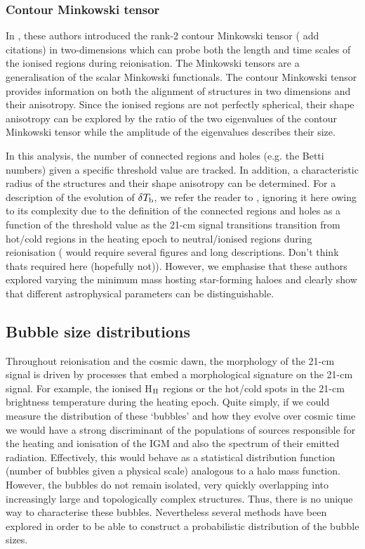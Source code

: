 \subsubsection{Contour Minkowski tensor}

In \cite{Kapahtia:2018,Kapahtia:2019}, these authors introduced the rank-2 contour Minkowski tensor ({\color{red} add citations}) in two-dimensions which can probe both the length and time scales of the ionised regions during reionisation. The Minkowski tensors are a generalisation of the scalar Minkowski functionals. The contour Minkowski tensor provides information on both the alignment of structures in two dimensions and their anisotropy. Since the ionised regions are not perfectly spherical, their shape anisotropy can be explored by the ratio of the two eigenvalues of the contour Minkowski tensor while the amplitude of the eigenvalues describes their size.

In this analysis, the number of connected regions and holes (e.g. the Betti numbers) given a specific threshold value are tracked. In addition, a characteristic radius of the structures and their shape anisotropy can be determined. For a description of the evolution of $\delta T_{\rm b}$, we refer the reader to \cite{Kapahtia:2019}, ignoring it here owing to its complexity due to the definition of the connected regions and holes as a function of the threshold value as the 21-cm signal transitions transition from hot/cold regions in the heating epoch to neutral/ionised regions during reionisation ({\color{red} would require several figures and long descriptions. Don't think thats required here (hopefully not)}). However, we emphasise that these authors explored varying the minimum mass hosting star-forming haloes and clearly show that different astrophysical parameters can be distinguishable.

\subsection{Bubble size distributions} \label{sec:BSDs}

Throughout reionisation and the cosmic dawn, the morphology of the 21-cm signal is driven by processes that embed a morphological signature on the 21-cm signal. For example, the ionised H$_{\rm \scriptsize II}$ regions or the hot/cold spots in the 21-cm brightness temperature during the heating epoch. Quite simply, if we could measure the distribution of these `bubbles' and how they evolve over cosmic time we would have a strong discriminant of the populations of sources responsible for the heating and ionisation of the IGM and also the spectrum of their emitted radiation. Effectively, this would behave as a statistical distribution function (number of bubbles given a physical scale) analogous to a halo mass function. However, the bubbles do not remain isolated, very quickly overlapping into increasingly large and topologically complex structures. Thus, there is no unique way to characterise these bubbles. Nevertheless several methods have been explored in order to be able to construct a probabilistic distribution of the bubble sizes.

